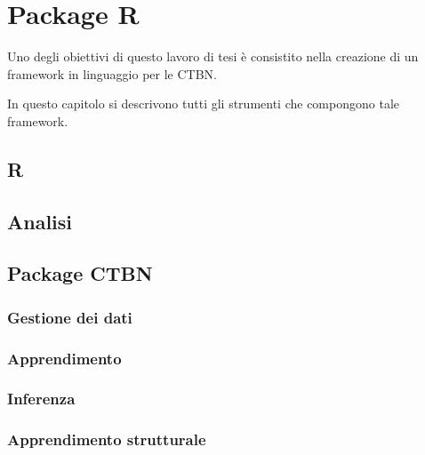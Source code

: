 
\chapter{Package R}
\label{cap:ctbnr}
Uno degli obiettivi di questo lavoro di tesi è consistito nella creazione di un framework in linguaggio  per le \acs{CTBN}.

In questo capitolo si descrivono tutti gli strumenti che compongono tale framework.

\section{R}
\omissis{}

\section{Analisi}
\omissis{}


\section{Package CTBN}
\omissis{}

\subsection{Gestione dei dati}
\omissis{}

\subsection{Apprendimento}
\omissis{}

\subsection{Inferenza}
\omissis{}

\subsection{Apprendimento strutturale}
\omissis{}

